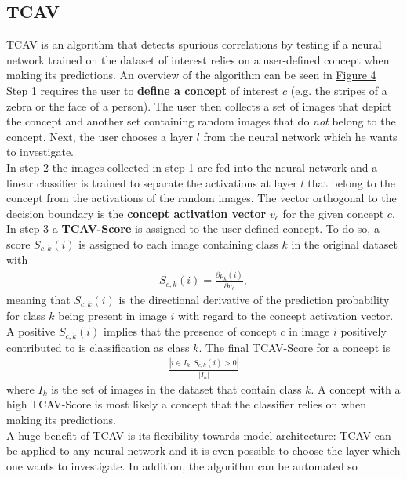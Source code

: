 \documentclass{article}
\begin{document}
\subsection{TCAV}
TCAV \cite{pmlr-v80-kim18d} is an algorithm that detects spurious correlations by testing if a neural network trained
on the dataset of interest relies on a user-defined concept when making its predictions. An overview of the algorithm
can be seen in \hyperref[fig:tcav]{Figure 4} \\
Step 1 requires the user to \textbf{define a concept} of interest $c$ (e.g. the stripes of a zebra
or the face of a person). The user then collects a set of images that depict the concept and another set
containing random images that do \textit{not} belong to the concept. Next, the user chooses a layer $l$ from
the neural network which he wants to investigate. \\
In step 2 the images collected in step 1 are fed into the neural network and a linear classifier is trained
to separate the activations at layer $l$ that belong to the concept from the activations of the random images.
The vector orthogonal to the decision boundary is the \textbf{concept activation vector} $v_c$ for the given concept $c$.\\
In step 3 a \textbf{TCAV-Score} is assigned to the user-defined concept. To do so, a score $S_{c,k}(i)$
is assigned to each image containing class $k$ in the original dataset with 
\begin{align*}
    S_{c,k}(i) = \frac{\partial p_k(i)}{\partial v_c},
\end{align*}
meaning that $S_{c,k}(i)$ is the directional derivative of the prediction probability for class $k$ being present
in image $i$ with regard to the concept activation vector. A positive $S_{c,k}(i)$ implies that the presence of
concept $c$ in image $i$ positively contributed to is classification as class $k$.
The final TCAV-Score for a concept is 
\begin{align*}
    \frac{|i \in I_k: S_{c,k}(i) > 0 |}{|I_k|}
\end{align*}
where $I_k$ is the set of images
in the dataset that contain class $k$. A concept with a high TCAV-Score is most likely a concept that the classifier
relies on when making its predictions. \\
A huge benefit of TCAV is its flexibility towards model architecture: TCAV can be applied to any neural network and
it is even possible to choose the layer which one wants to investigate. In addition, the algorithm can be automated so
\end{document}
